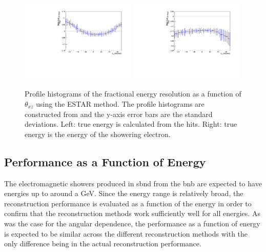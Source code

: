 \begin{figure}[h!]
    \centering
    \includegraphics[width = 0.49\textwidth]{figures-chap4/frac_res_vs_thetaXZ_cheating_electron_vertex_plane2_cut_ESTAR_profile.pdf}
    \includegraphics[width = 0.49\textwidth]{figures-chap4/frac_res_vs_thetaXZ_cheating_electron_vertex_plane2_cut_showeringE_ESTAR_profile.pdf}
    \caption[Profile histograms of the fractional energy resolution as a function of $\theta_{xz}$.]{Profile histograms of the fractional energy resolution as a function of $\theta_{xz}$ using the ESTAR method. The profile histograms are constructed from  and the y-axis error bars are the standard deviations.  Left: true energy is calculated from the hits. Right: true energy is the energy of the showering electron.}
    \label{fig:reconstruction_as_a_function_of_angle_profile}
\end{figure}

\clearpage
\subsection{Performance as a Function of Energy}
The electromagnetic showers produced in \gls{sbnd} from the \gls{bnb} are expected to have energies up to around a GeV. 
Since the energy range is relatively broad, the reconstruction performance is evaluated as a function of the energy in order to confirm that the reconstruction methods work sufficiently well for all energies. As was the case for the angular dependence, the performance as a function of energy is expected to be similar across the different reconstruction methods with the only difference being in the actual reconstruction performance. 

